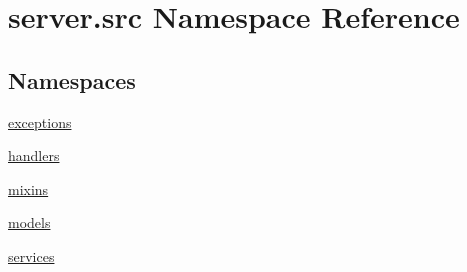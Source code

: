\hypertarget{namespaceserver_1_1src}{}\section{server.\+src Namespace Reference}
\label{namespaceserver_1_1src}
\subsection*{Namespaces}
\begin{DoxyCompactItemize}
\item 
 \hyperlink{namespaceserver_1_1src_1_1exceptions}{exceptions}
\item 
 \hyperlink{namespaceserver_1_1src_1_1handlers}{handlers}
\item 
 \hyperlink{namespaceserver_1_1src_1_1mixins}{mixins}
\item 
 \hyperlink{namespaceserver_1_1src_1_1models}{models}
\item 
 \hyperlink{namespaceserver_1_1src_1_1services}{services}
\end{DoxyCompactItemize}
